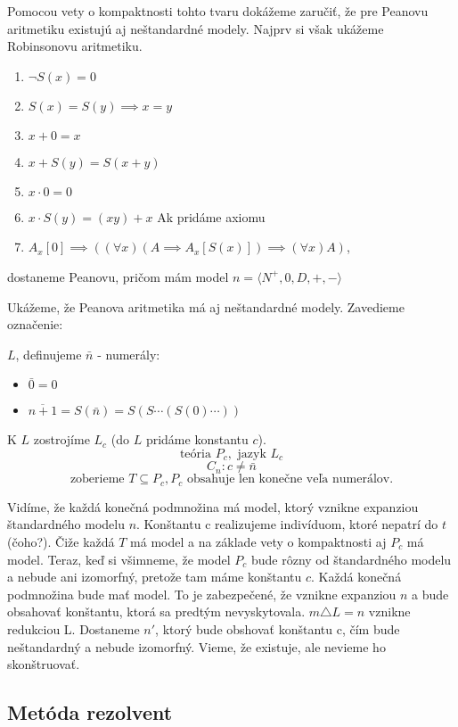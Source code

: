 Pomocou vety o kompaktnosti tohto tvaru dokážeme zaručiť, že pre Peanovu aritmetiku
existujú aj neštandardné modely. Najprv si však ukážeme Robinsonovu aritmetiku.

\begin{enumerate}
\item $\neg S(x) = 0$
\item $S(x) = S(y) \implies x=y$
\item $x+0 = x$
\item $x+S(y) = S(x+y)$
\item $x\cdot 0 = 0$
\item $x\cdot S(y)= (xy)+x$
Ak pridáme axiomu
\item $A_x[0] \implies ((\forall x)(A \implies A_x[S(x)]) \implies (\forall x)A)$,
\end{enumerate}
dostaneme Peanovu, pričom mám model $n = \langle N^+,0,D,+,-\rangle$

Ukážeme, že Peanova aritmetika má aj neštandardné modely. Zavedieme označenie:

$L$, definujeme $\bar{n}$ - numerály:
\begin{itemize}
\item $\bar{0} = 0$
\item $\overline{n+1} = S(\bar{n}) = S(S \cdots (S(0) \cdots ))$
\end{itemize}

K $L$ zostrojíme $L_c$ (do $L$ pridáme konstantu $c$).
$$\mbox{teória }P_c,\mbox{ jazyk }L_c$$
$$C_n: c \not= \bar{n}$$
$$\mbox{zoberieme }T \subseteq P_c, P_c \mbox{ obsahuje len konečne veľa numerálov.}$$

Vidíme, že každá konečná podmnožina má model, ktorý vznikne expanziou štandardného modelu $n$.
Konštantu c realizujeme indivíduom, ktoré nepatrí do $t$ (čoho?).
Čiže každá $T$ má model a na základe vety o kompaktnosti aj $P_c$ má model. Teraz, keď si všimneme,
že model $P_c$ bude rôzny od štandardného modelu a nebude ani izomorfný, pretože tam máme konštantu $c$.
Každá konečná podmnožina bude mať model. To je zabezpečené, že vznikne expanziou $n$
a bude obsahovať konštantu, ktorá sa predtým nevyskytovala.
$m\triangle L = n$ vznikne redukciou L. Dostaneme $n'$, ktorý bude obshovať konštantu c,
čím bude neštandardný a nebude izomorfný. Vieme, že existuje, ale nevieme ho skonštruovať.

\subsection{Metóda rezolvent}

